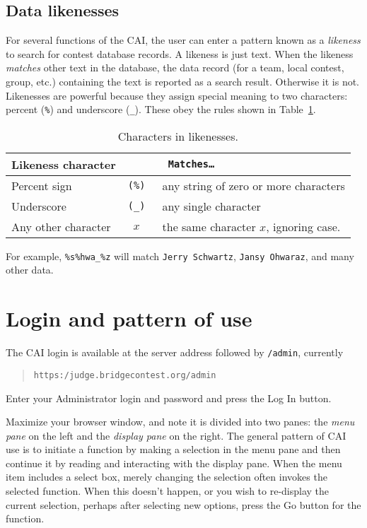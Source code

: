 \documentclass[11pt,letterpaper]{refart}
\def\nada{\hspace{0pt}}
\def\ui#1{\textsf{#1}}
\begin{document}
\subsection{Data likenesses}
For several functions of the CAI, the user can enter a pattern known
as a \emph{likeness} to search for contest database records. A
likeness is just text. When the likeness \emph{matches} other text in
the database, the data record (for a team, local contest, group, etc.)
containing the text is reported as a search result. Otherwise it is
not.  Likenesses are powerful because they assign special meaning to
two characters: percent (\texttt{\%}) and underscore
(\texttt{\_}). These obey the rules shown in
Table~\ref{tbl:likeness}.\
\begin{table}
\centering
\caption{Characters in likenesses.}
\begin{tabular}{l>{\tt}cl}
\multicolumn{2}{l}{\bfseries Likeness character} & {\bfseries Matches\ldots} \\ \hline
Percent sign & (\texttt{\%}\nada) & any string of zero or more characters \\
Underscore  & (\texttt{\_}\nada)  & any single character \\
Any other character & $x$ & the same character $x$, ignoring case.
\end{tabular}
\label{tbl:likeness}
\end{table}

For example, \texttt{\%s\%hwa\_\%z} will match \texttt{Jerry Schwartz}, 
\texttt{Jansy Ohwaraz}, and many other data.

\section{Login and pattern of use}
The CAI login is available at the server address followed by
\texttt{/admin}, currently
\begin{quote} 
\texttt{https:/judge.bridgecontest.org/admin}
\end{quote}
Enter your Administrator login and password and press the \ui{Log In} button.

Maximize your browser window, and note it is divided into two panes:
the \emph{menu pane} on the left and the \emph{display pane} on the
right. The general pattern of CAI use is to initiate a function by
making a selection in the menu pane and then continue it by reading
and interacting with the display pane. When the menu item includes a
select box, merely changing the selection often invokes the selected
function.  When this doesn't happen, or you wish to re-display the
current selection, perhaps after selecting new options, press the
\ui{Go} button for the function.
\end{document}
